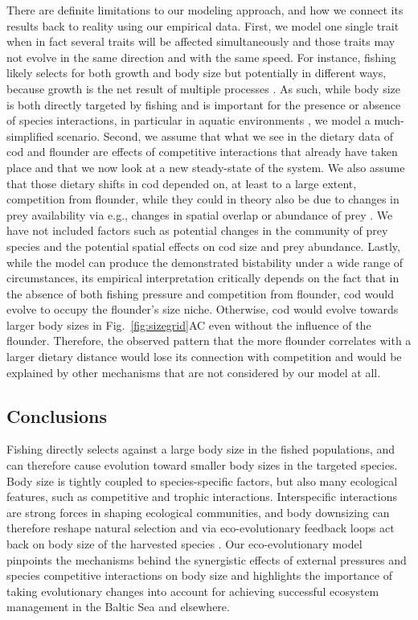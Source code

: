 \documentclass[9pt,twocolumn,twoside]{pnas-new}
\begin{document}
There are definite limitations to our modeling approach, and how we connect its results back to reality using our empirical data. First, we model one single trait when in fact several traits will be affected simultaneously and those traits may not evolve in the same direction and with the same speed. For instance, fishing likely selects for both growth and body size but potentially in different ways, because growth is the net result of multiple processes \citep{Rubalcaba2020}. As such, while body size is both directly targeted by fishing and is important for the presence or absence of species interactions, in particular in aquatic environments \citep{Ings2009}, we model a much-simplified scenario. Second, we assume that what we see in the dietary data of cod and flounder are effects of competitive interactions that already have taken place and that we now look at a new steady-state of the system. We also assume that those dietary shifts in cod depended on, at least to a large extent, competition from flounder, while they could in theory also be due to changes in prey availability via e.g., changes in spatial overlap or abundance of prey \citep{Enberg2012}.  We have not included factors such as potential changes in the community of prey species and the potential spatial effects on cod size and prey abundance. Lastly, while the model can produce the demonstrated bistability under a wide range of circumstances, its empirical interpretation critically depends on the fact that in the absence of both fishing pressure and competition from flounder, cod would evolve to occupy the flounder's size niche. Otherwise, cod would evolve towards larger body sizes in Fig.~\ref{fig:sizegrid}AC even without the influence of the flounder. Therefore, the observed pattern that the more flounder correlates with a larger dietary distance would lose its connection with competition and would be explained by other mechanisms that are not considered by our model at all.

\subsection*{Conclusions}

Fishing directly selects against a large body size in the fished populations, and can therefore cause evolution toward smaller body sizes in the targeted species. Body size is tightly coupled to species-specific factors, but also many ecological features, such as competitive and trophic interactions. Interspecific interactions are strong forces in shaping ecological communities, and body downsizing can therefore reshape natural selection and via eco-evolutionary feedback loops act back on body size of the harvested species \citep{Edeline2021}. Our eco-evolutionary model pinpoints the mechanisms behind the synergistic effects of external pressures and species competitive interactions on body size and highlights the importance of taking evolutionary changes into account for achieving successful ecosystem management in the Baltic Sea and elsewhere.
\end{document}
